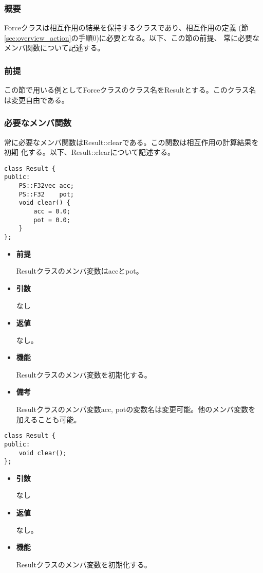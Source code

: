 \subsubsection{概要}

Forceクラスは相互作用の結果を保持するクラスであり、相互作用の定義
(節\ref{sec:overview_action}の手順0)に必要となる。以下、この節の前提、
常に必要なメンバ関数について記述する。

\subsubsection{前提}

この節で用いる例としてForceクラスのクラス名をResultとする。このクラス名
は変更自由である。

\subsubsection{必要なメンバ関数}

常に必要なメンバ関数はResult::clearである。この関数は相互作用の計算結果を初期
化する。以下、Result::clearについて記述する。


\begin{screen}
\begin{verbatim}
class Result {
public:
    PS::F32vec acc;
    PS::F32    pot;
    void clear() {
        acc = 0.0;
        pot = 0.0;
    }
};
\end{verbatim}
\end{screen}

\begin{itemize}

\item {\bf 前提}
  
  Resultクラスのメンバ変数はaccとpot。
  
\item {\bf 引数}

  なし
  
\item {\bf 返値}

  なし。
  
\item {\bf 機能}

  Resultクラスのメンバ変数を初期化する。
  
\item {\bf 備考}

  Resultクラスのメンバ変数acc, potの変数名は変更可能。他のメンバ変数を
  加えることも可能。

\end{itemize}
\fi

\begin{screen}
\begin{verbatim}
class Result {
public:
    void clear();
};
\end{verbatim}
\end{screen}

\begin{itemize}

\item {\bf 引数}

  なし
  
\item {\bf 返値}

  なし。
  
\item {\bf 機能}

  Resultクラスのメンバ変数を初期化する。
  
\end{itemize}
